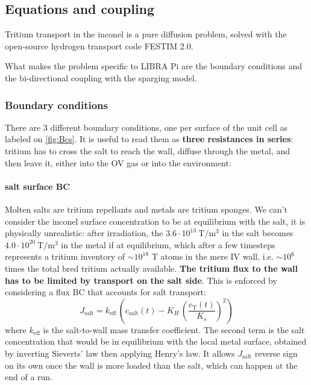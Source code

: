 \documentclass[a4paper,11pt,oneside]{report}
\begin{document}



\subsection{Equations and coupling}

Tritium transport in the inconel is a pure diffusion problem, solved with the open-source hydrogen transport code FESTIM 2.0\cite{dark_festim_2026}. 

What makes the problem specific to LIBRA Pi are the boundary conditions and the bi-directional coupling with the sparging model.

\subsubsection{Boundary conditions}

There are 3 different boundary conditions, one per surface of the unit cell as labeled on \cref{fig:Bcs}. It is useful to read them as \textbf{three resistances in series}: tritium has to cross the salt to reach the wall, diffuse through the metal, and then leave it, either into the OV gas or into the environment:

\paragraph{salt surface BC} 
Molten salts are tritium repellants and metals are tritium sponges. We can't consider the inconel surface concentration to be at equilibrium with the salt, it is physically unrealistic: after irradiation, the $3.6\cdot10^{13} \ \mathrm{T/m^3}$ in the salt becomes $4.0\cdot10^{20}\ \mathrm{T/m^3}$ in the metal if at equilibrium, which after a few timesteps represents a tritium inventory  of $\sim10^{18}$ T atoms in the mere IV wall, i.e. $\sim10^6$ times the total bred tritium actually available. \textbf{The tritium flux to the wall has to be limited by transport on the salt side}. This is enforced by considering a flux BC that accounts for salt transport:
\begin{equation}
\label{eq:salt_BC}
    J_\mathrm{salt}=k_\mathrm{eff}\,\left(c_\mathrm{salt}(t)-K_H\,\left(\frac{c_\mathrm{T}(t)}{K_s}\right)^2\right)
\end{equation}
where $k_\mathrm{eff}$ is the salt-to-wall mass transfer coefficient. The second term is the salt concentration that would be in equilibrium with the local metal surface, obtained by inverting Sieverts' law then applying Henry's law. It allows $J_\mathrm{salt}$ reverse sign on its own once the wall is more loaded than the salt, which can happen at the end of a run.
\end{document}
